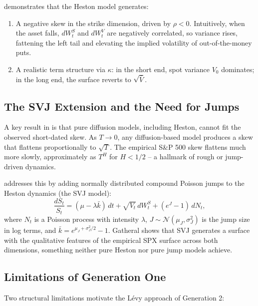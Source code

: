 \documentclass[12pt, a4paper]{article}
\begin{document}
\citet{gatheral2006} demonstrates that the Heston model generates:
\begin{enumerate}[label=(\roman*)]
  \item A negative skew in the strike dimension, driven by $\rho < 0$.
        Intuitively, when the asset falls, $dW_t^S$ and $dW_t^V$ are
        negatively correlated, so variance rises, fattening the left
        tail and elevating the implied volatility of
        out-of-the-money puts.
  \item A realistic term structure via $\kappa$: in the short end,
        spot variance $V_0$ dominates; in the long end, the surface
        reverts to $\sqrt{\bar{V}}$.
\end{enumerate}

\subsection{The SVJ Extension and the Need for Jumps}

A key result in \citet{gatheral2006} is that pure diffusion models,
including Heston, cannot fit the observed short-dated skew. As $T
\to 0$, any diffusion-based model produces a skew that flattens
proportionally to $\sqrt{T}$. The empirical S\&P 500 skew flattens
much more slowly, approximately as $T^H$ for $H < 1/2$ -- a
hallmark of rough or jump-driven dynamics.

\citet{bates1996} addresses this by adding normally distributed
compound Poisson jumps to the Heston dynamics (the SVJ model):
\begin{equation}
  \frac{dS_t}{S_t} = (\mu - \lambda\bar{k})\,dt
  + \sqrt{V_t}\,dW_t^S + (e^J - 1)\,dN_t,
  \label{eq:svj}
\end{equation}
where $N_t$ is a Poisson process with intensity $\lambda$,
$J \sim \mathcal{N}(\mu_J, \sigma_J^2)$ is the jump size in log
terms, and $\bar{k} = e^{\mu_J + \sigma_J^2/2} - 1$. Gatheral shows
that SVJ generates a surface with the qualitative features of the
empirical SPX surface across both dimensions, something neither
pure Heston nor pure jump models achieve.

\subsection{Limitations of Generation One}

Two structural limitations motivate the L\'{e}vy approach of
Generation 2:
\end{document}
